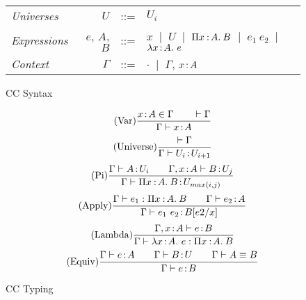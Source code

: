 \begin{figure}
	\renewcommand{\arraystretch}{1.3}
	\begin{tabular}{l r l l}
		\textit{Universes}   & $U$       & ::= & ${U_i}$ \\
		\textit{Expressions} & ${e}$, ${A}$, ${B}$  & ::= & 
			${x}$ $\ |\ $ ${U}$ $\ |\ $ $\Pi x\mkern1.5mu{\hspace{0.5mm}{:}\hspace{0.5mm}} A.\hspace{0.8mm}B$ $\ |\ $ ${e_1}\ {e_2}$ $\ |\ $ $\lambda x\hspace{0.5mm}{:}\hspace{0.5mm} A.\ e$\\
		\textit{Context} & ${\Gamma}$ & ::= & ${\cdot}$ $\ |\ $ ${\Gamma}$, ${x} \hspace{0.5mm}{:}\hspace{0.5mm} {A}$ \\
	\end{tabular}
	\caption{CC Syntax}
	\label{fig:cc syntax}	
\end{figure}
\begin{figure}
\vspace{0.5cm}
	\begin{equation}
		\tag{Var}
		\frac
			{x \hspace{0.5mm}{:}\hspace{0.5mm} A \in \Gamma \qquad \vdash \Gamma}
			{\Gamma \vdash x \hspace{0.5mm}{:}\hspace{0.5mm} A}
	\end{equation} \hspace{0.5cm}
	\begin{equation}
		\tag{Universe}
		\frac
			{\vdash \Gamma}
			{\Gamma \vdash U_i \hspace{0.5mm}{:}\hspace{0.5mm} U_{i+1}}
	\end{equation} \hspace{0.5cm}
	\begin{equation}
		\tag{Pi}
		\frac
			{\Gamma \vdash A \hspace{0.5mm}{:}\hspace{0.5mm} U_i \qquad \Gamma, x \hspace{0.5mm}{:}\hspace{0.5mm} A \vdash B \hspace{0.5mm}{:}\hspace{0.5mm} U_j
			}
			{\Gamma \vdash \Pi x\mkern1.5mu{\hspace{0.5mm}{:}\hspace{0.5mm}} A.\hspace{0.8mm}B \hspace{0.5mm}{:}\hspace{0.5mm} U_{max(i, j)}}
	\end{equation} \hspace{0.5cm}
	\begin{equation}
		\tag{Apply}
		\frac
			{\Gamma \vdash e_1 \mathrel{:} \Pi x\mkern1.5mu{\hspace{0.5mm}{:}\hspace{0.5mm}} A.\hspace{0.8mm}B \qquad \Gamma \vdash e_2 \hspace{0.5mm}{:}\hspace{0.5mm} A}
			{\Gamma \vdash e_1 \ e_2 \hspace{0.5mm}{:}\hspace{0.5mm} B[e2\slash x]}
	\end{equation} \hspace{0.5cm}
	\begin{equation}
		\tag{Lambda}
		\frac
			{ \Gamma, x \hspace{0.5mm}{:}\hspace{0.5mm} A \vdash e \hspace{0.5mm}{:}\hspace{0.5mm} B}
			{ \Gamma \vdash \lambda x\hspace{0.5mm}{:}\hspace{0.5mm} A.\ e \mathrel{:} \Pi x\mkern1.5mu{\hspace{0.5mm}{:}\hspace{0.5mm}} A.\hspace{0.8mm}B}
	\end{equation} \hspace{0.5cm}
	\begin{equation}
		\tag{Equiv}
		\frac
			{\Gamma \vdash e \hspace{0.5mm}{:}\hspace{0.5mm} A \qquad \Gamma \vdash B \hspace{0.5mm}{:}\hspace{0.5mm} U \qquad \Gamma \vdash A \equiv B}
			{\Gamma \vdash e \hspace{0.5mm}{:}\hspace{0.5mm} B}
	\end{equation}
	\caption{CC Typing}
	\label{fig:cc typing}
\end{figure}

